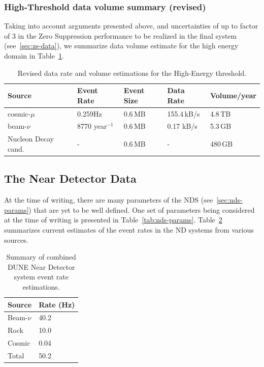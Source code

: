 \subsubsection{High-Threshold data volume summary (revised)}
\label{sec:fd-data-volume-summary}
Taking into account arguments presented above, and uncertainties of up to factor of 3 in the Zero Suppression
performance to be realized in the final system (see~\ref{sec:zs-data}), we summarize data volume estimate for
the high energy domain in Table~\ref{tab:fd-data-volume-summary}.
\begin{table}[ht!]
\centering
\begin{tabular}{| p{1.5in} | p{0.95in} | p{0.75in} | p{0.8in} | p{0.9in} |}		\hline	
Source & Event Rate & Event Size & Data Rate & Volume/year \\ \hline
cosmic-$\mu$ & 0.259Hz & 0.6\,MB & 155.4\,kB/s & 4.8\,TB \\ \hline
beam-$\nu$ & 8770 year$^{-1}$ & 0.6\,MB & 0.17 kB/s & 5.3\,GB \\ \hline
Nucleon Decay cand. & - & 0.6\,MB & - & 480\,GB \\ \hline
\end{tabular}
\caption{Revised data rate and volume estimations for the High-Energy threshold.}
\label{tab:fd-data-volume-summary}
\end{table}



\subsection{The Near Detector Data}
\label{sec:nds-event-rates}
At the time of writing, there are many parameters of the NDS (see~\ref{sec:nds-params})
that are yet to be well defined. One set of parameters being considered at the time of writing is presented in
Table~\ref{tab:nds-params}. Table~\ref{tab:nds-event-rates} summarizes current estimates of the event rates
in the ND systems from various sources.

\begin{table}[ht!]
\centering
\begin{tabular}{| p{0.8in} | p{0.8in} |}		\hline		
\textbf{Source} & \textbf{Rate} (Hz)\\ \hline
Beam-$\nu$ & 40.2 \\ \hline
Rock & 10.0 \\ \hline
Cosmic & 0.04 \\ \hline
Total & 50.2 \\ \hline
\end{tabular}
\caption{Summary of combined DUNE Near Detector system event rate estimations.}
\label{tab:nds-event-rates}
\end{table}

